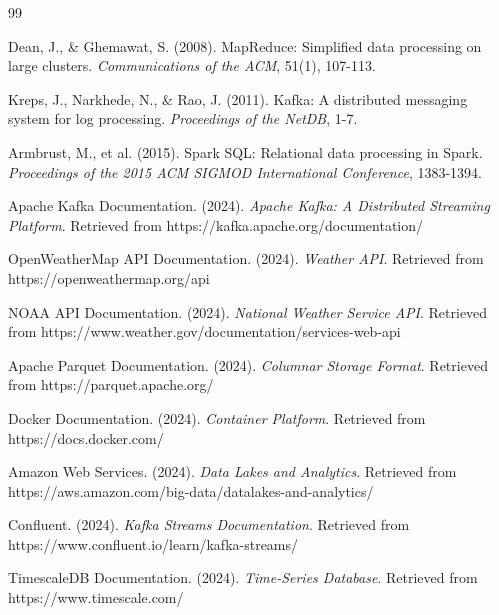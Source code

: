 \documentclass[12pt,a4paper]{article}
\begin{document}
\begin{thebibliography}{99}

Dean, J., \& Ghemawat, S. (2008). MapReduce: Simplified data processing on large clusters. \textit{Communications of the ACM}, 51(1), 107-113.

Kreps, J., Narkhede, N., \& Rao, J. (2011). Kafka: A distributed messaging system for log processing. \textit{Proceedings of the NetDB}, 1-7.

Armbrust, M., et al. (2015). Spark SQL: Relational data processing in Spark. \textit{Proceedings of the 2015 ACM SIGMOD International Conference}, 1383-1394.

Apache Kafka Documentation. (2024). \textit{Apache Kafka: A Distributed Streaming Platform}. Retrieved from https://kafka.apache.org/documentation/

OpenWeatherMap API Documentation. (2024). \textit{Weather API}. Retrieved from https://openweathermap.org/api

NOAA API Documentation. (2024). \textit{National Weather Service API}. Retrieved from https://www.weather.gov/documentation/services-web-api

Apache Parquet Documentation. (2024). \textit{Columnar Storage Format}. Retrieved from https://parquet.apache.org/

Docker Documentation. (2024). \textit{Container Platform}. Retrieved from https://docs.docker.com/

Amazon Web Services. (2024). \textit{Data Lakes and Analytics}. Retrieved from https://aws.amazon.com/big-data/datalakes-and-analytics/

Confluent. (2024). \textit{Kafka Streams Documentation}. Retrieved from https://www.confluent.io/learn/kafka-streams/

TimescaleDB Documentation. (2024). \textit{Time-Series Database}. Retrieved from https://www.timescale.com/

\end{thebibliography}
\end{document}
